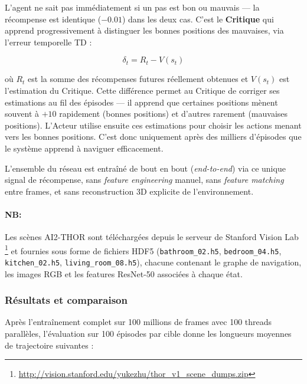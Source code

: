 L'agent ne sait pas immédiatement si un pas est bon ou mauvais — la 
récompense est identique ($-0.01$) dans les deux cas. C'est le 
\textbf{Critique} qui apprend progressivement à distinguer les bonnes 
positions des mauvaises, via l'erreur temporelle TD :

\begin{equation}
    \delta_t = R_t - V(s_t)
    \label{eq:td_error}
\end{equation}

où $R_t$ est la somme des récompenses futures réellement obtenues et 
$V(s_t)$ est l'estimation du Critique. Cette différence permet au 
Critique de corriger ses estimations au fil des épisodes — il apprend 
que certaines positions mènent souvent à $+10$ rapidement (bonnes 
positions) et d'autres rarement (mauvaises positions). L'Acteur utilise 
ensuite ces estimations pour choisir les actions menant vers les bonnes 
positions. C'est donc uniquement après des milliers d'épisodes que le 
système apprend à naviguer efficacement.

L'ensemble du réseau est entraîné de bout en bout (\textit{end-to-end}) 
via ce unique signal de récompense, sans \textit{feature engineering} 
manuel, sans \textit{feature matching} entre frames, et sans 
reconstruction 3D explicite de l'environnement.


\paragraph{NB:}

Les scènes AI2-THOR sont téléchargées depuis le serveur de Stanford 
Vision Lab \footnote{\url{http://vision.stanford.edu/yukezhu/thor_v1_scene_dumps.zip}} 
et fournies sous forme de fichiers HDF5 (\texttt{bathroom\_02.h5}, 
\texttt{bedroom\_04.h5},
\texttt{kitchen\_02.h5},
\texttt{living\_room\_08.h5}), chacune contenant le graphe de navigation, les images RGB et les features ResNet-50 associées à chaque état.

\subsubsection*{Résultats et comparaison}

Après l'entraînement complet sur 100 millions de frames avec 100 threads parallèles, l'évaluation sur 100 épisodes par cible donne les longueurs moyennes de trajectoire suivantes :



